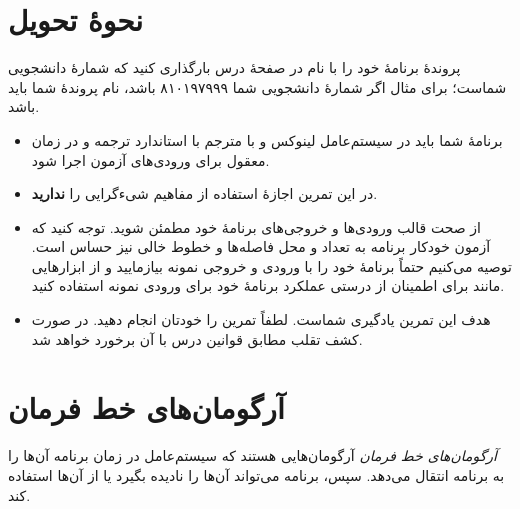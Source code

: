 \documentclass{utap}
\begin{document}
    \begin{latin}
    \begin{figure}
    \centering
    {\fontsize{4.4}{4.4} \selectfont
    }
    \end{figure}
    \end{latin}

    \clearpage
    
    \section{نحوهٔ تحویل}

    پروندهٔ برنامهٔ خود را با نام  در صفحهٔ  درس بارگذاری کنید که  شمارهٔ دانشجویی شماست؛ برای مثال اگر شمارهٔ دانشجویی شما ۸۱۰۱۹۷۹۹۹ باشد، نام پروندهٔ شما باید  باشد.

    \begin{itemize}
        \item برنامهٔ شما باید در سیستم‌عامل لینوکس و با مترجم  با استاندارد  ترجمه و در زمان معقول برای ورودی‌های آزمون اجرا شود.
        \item در این تمرین اجازهٔ استفاده از مفاهیم شیءگرایی را \textbf{ندارید}.
        \item از صحت قالب ورودی‌ها و خروجی‌های برنامهٔ خود مطمئن شوید. توجه کنید که آزمون خودکار برنامه به تعداد و محل فاصله‌ها و خطوط خالی نیز حساس است. توصیه می‌کنیم حتماً برنامهٔ خود را با ورودی و خروجی نمونه بیازمایید و از ابزارهایی مانند  برای اطمینان از درستی عملکرد برنامهٔ خود برای ورودی نمونه استفاده کنید.
        \item هدف این تمرین یادگیری شماست. لطفاً تمرین را خودتان انجام دهید. در صورت کشف تقلب مطابق قوانین درس با آن برخورد خواهد شد.
    \end{itemize}

    \appendix

    \section[آرگومان‌های خط فرمان]{آرگومان‌های خط فرمان\label{sec:commandline-args}}

    \textit{آرگومان‌های خط فرمان} آرگومان‌هایی هستند که سیستم‌عامل در زمان برنامه آن‌ها را به برنامه انتقال می‌دهد. سپس، برنامه می‌تواند آن‌ها را نادیده بگیرد یا از آن‌ها استفاده کند.
\end{document}
